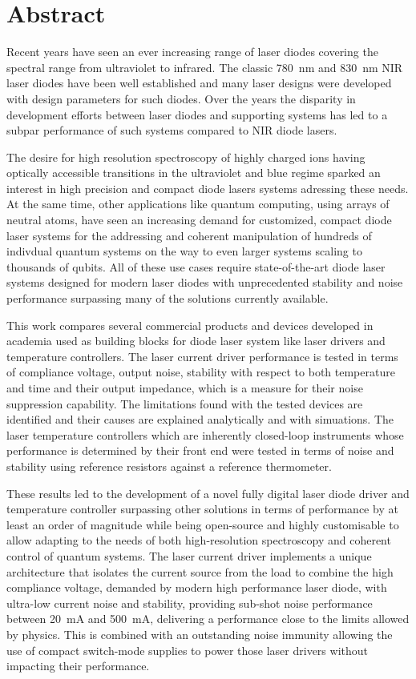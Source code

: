 \section*{Abstract}
Recent years have seen an ever increasing range of laser diodes covering the spectral range from ultraviolet to infrared. The classic \qty{780}{\nm} and \qty{830}{\nm} NIR laser diodes have been well established and many laser designs were developed with design parameters for such diodes. Over the years the disparity in development efforts between laser diodes and supporting systems has led to a subpar performance of such systems compared to NIR diode lasers.

The desire for high resolution spectroscopy of highly charged ions having optically accessible transitions in the ultraviolet and blue regime sparked an interest in high precision and compact diode lasers systems adressing these needs. At the same time, other applications like quantum computing, using arrays of neutral atoms, have seen an increasing demand for customized, compact diode laser systems for the addressing and coherent manipulation of hundreds of indivdual quantum systems on the way to even larger systems scaling to thousands of qubits. All of these use cases require state-of-the-art diode laser systems designed for modern laser diodes with unprecedented stability and noise performance surpassing many of the solutions currently available.

This work compares several commercial products and devices developed in academia used as building blocks for diode laser system like laser drivers and temperature controllers. The laser current driver performance is tested in terms of compliance voltage, output noise, stability with respect to both temperature and time and their output impedance, which is a measure for their noise suppression capability. The limitations found with the tested devices are identified and their causes are explained analytically and with simuations. The laser temperature controllers which are inherently closed-loop instruments whose performance is determined by their front end were tested in terms of noise and stability using reference resistors against a reference thermometer.

These results led to the development of a novel fully digital laser diode driver and temperature controller surpassing other solutions in terms of performance by at least an order of magnitude while being open-source and highly customisable to allow adapting to the needs of both high-resolution spectroscopy and coherent control of quantum systems. The laser current driver implements a unique architecture that isolates the current source from the load to combine the high compliance voltage, demanded by modern high performance laser diode, with ultra-low current noise and stability, providing sub-shot noise performance between \qty{20}{\mA} and \qty{500}{\mA}, delivering a performance close to the limits allowed by physics. This is combined with an outstanding noise immunity allowing the use of compact switch-mode supplies to power those laser drivers without impacting their performance.

